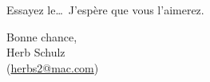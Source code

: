 \documentclass[11pt,french]{article}
\newcommand{\TS}{\textsf{\TeX Shop}}
\newcommand{\mnu}[1]{\textsf{#1}}
\newcommand{\cmd}[1]{\textsf{#1}}
\begin{document}
%

%


%


\vspace{5pt plus 2pt minus 1pt}\noindent
Essayez le\dots\ J'espère que vous l'aimerez.

\vspace{5pt plus 2pt minus 1pt}
\noindent Bonne chance,\\
Herb Schulz\\
(\href{mailto:herbs2@mac.com}{herbs2@mac.com})
\end{document}
